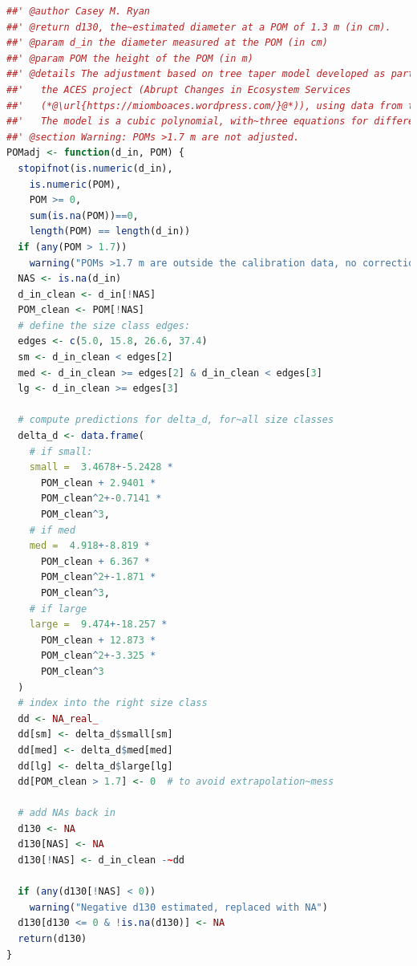 \documentclass[diversity,article,accept,moreauthors,pdftex]{Definitions/mdpi}
\begin{document}
\begin{lstlisting}[language=R]
##' @author Casey M. Ryan
##' @return d130, the~estimated diameter at a POM of 1.3 m (in cm). 
##' @param d_in the diameter measured at the POM (in cm)
##' @param POM the height of the POM (in m)
##' @details The adjustment based on tree taper model developed as part of 
##'   the ACES project (Abrupt Changes in Ecosystem Services 
##'   (*@\url{https://miomboaces.wordpress.com/}@*)), using data from the miombo of Niassa. 
##'   The model is a cubic polynomial, with~three equations for different sized stems. 
##' @section Warning: POMs >1.7 m are not adjusted.
POMadj <- function(d_in, POM) {
  stopifnot(is.numeric(d_in),
    is.numeric(POM),
    POM >= 0,
    sum(is.na(POM))==0,
    length(POM) == length(d_in))
  if (any(POM > 1.7))
    warning("POMs >1.7 m are outside the calibration data, no correction applied") 
  NAS <- is.na(d_in)
  d_in_clean <- d_in[!NAS]
  POM_clean <- POM[!NAS]
  # define the size class edges:
  edges <- c(5.0, 15.8, 26.6, 37.4)
  sm <- d_in_clean < edges[2]
  med <- d_in_clean >= edges[2] & d_in_clean < edges[3]
  lg <- d_in_clean >= edges[3]
  
  # compute predictions for delta_d, for~all size classes
  delta_d <- data.frame(
    # if small:
    small =  3.4678+-5.2428 * 
   	  POM_clean + 2.9401 * 
      POM_clean^2+-0.7141 * 
      POM_clean^3,
    # if med
    med =  4.918+-8.819 * 
      POM_clean + 6.367 * 
      POM_clean^2+-1.871 * 
      POM_clean^3,
    # if large
    large =  9.474+-18.257 * 
      POM_clean + 12.873 * 
      POM_clean^2+-3.325 * 
      POM_clean^3
  )
  # index into the right size class
  dd <- NA_real_
  dd[sm] <- delta_d$small[sm]
  dd[med] <- delta_d$med[med]
  dd[lg] <- delta_d$large[lg]
  dd[POM_clean > 1.7] <- 0  # to avoid extrapolation~mess
  
  # add NAs back in
  d130 <- NA
  d130[NAS] <- NA
  d130[!NAS] <- d_in_clean -~dd
  
  if (any(d130[!NAS] < 0))
    warning("Negative d130 estimated, replaced with NA")
  d130[d130 <= 0 & !is.na(d130)] <- NA
  return(d130)
}
\end{lstlisting}

\end{document}
